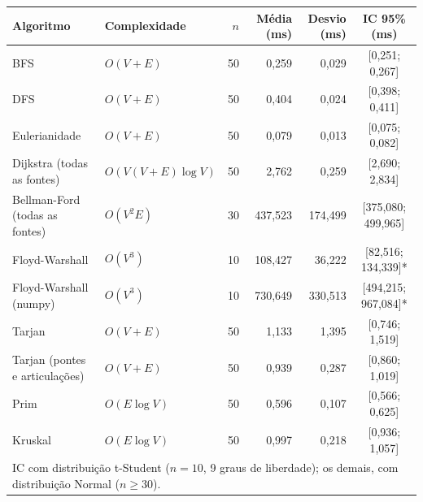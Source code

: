 \begin{tabular}{llrrrc}
  \toprule
  Algoritmo & Complexidade & $n$ & Média (ms) & Desvio (ms) & IC 95\% (ms) \\
  \midrule
  BFS & $O(V+E)$ & 50 & 0,259 & 0,029 & [0,251; 0,267] \\
  DFS & $O(V+E)$ & 50 & 0,404 & 0,024 & [0,398; 0,411] \\
  Eulerianidade & $O(V+E)$ & 50 & 0,079 & 0,013 & [0,075; 0,082] \\
  Dijkstra (todas as fontes) & $O(V(V+E)\log V)$ & 50 & 2,762 & 0,259 & [2,690; 2,834] \\
  Bellman-Ford (todas as fontes) & $O(V^2 E)$ & 30 & 437,523 & 174,499 & [375,080; 499,965] \\
  Floyd-Warshall & $O(V^3)$ & 10 & 108,427 & 36,222 & [82,516; 134,339]* \\
  Floyd-Warshall (numpy) & $O(V^3)$ & 10 & 730,649 & 330,513 & [494,215; 967,084]* \\
  Tarjan & $O(V+E)$ & 50 & 1,133 & 1,395 & [0,746; 1,519] \\
  Tarjan (pontes e articulações) & $O(V+E)$ & 50 & 0,939 & 0,287 & [0,860; 1,019] \\
  Prim & $O(E\log V)$ & 50 & 0,596 & 0,107 & [0,566; 0,625] \\
  Kruskal & $O(E\log V)$ & 50 & 0,997 & 0,218 & [0,936; 1,057] \\
  \bottomrule
  \multicolumn{6}{l}{\footnotesize * IC com distribuição t-Student ($n = 10$, 9 graus de liberdade); os demais, com distribuição Normal ($n \geq 30$).} \\
\end{tabular}
